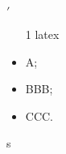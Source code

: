 \documentclass{sig-alternate-05-2015}
\begin{document}
$'$

\begin{itemize}
\item[1] latex

\end{itemize}

\begin{itemize}
    \item A;
    \item  BBB;
    \item  CCC.
\end{itemize}s
\end{document}
